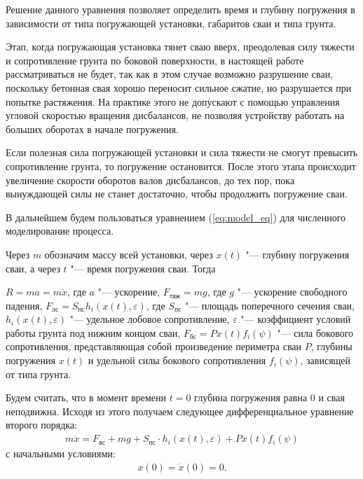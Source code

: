 Решение данного уравнения позволяет определить время и глубину погружения в зависимости от типа погружающей установки, габаритов сваи и типа грунта.

Этап, когда погружающая установка тянет сваю вверх, преодолевая силу тяжести и сопротивление грунта по боковой поверхности, в настоящей работе
рассматриваться не будет, так как в этом случае возможно разрушение сваи, поскольку бетонная свая хорошо переносит сильное сжатие, но разрушается
при попытке растяжения. На практике этого не допускают с помощью управления угловой скоростью вращения дисбалансов, не позволяя устройству
работать на больших оборотах в начале погружения.

Если полезная сила погружающей установки и сила тяжести не смогут превысить сопротивление грунта, то погружение остановится. После этого
этапа происходит увеличение скорости оборотов валов дисбалансов, до тех пор, пока вынуждающей силы не станет достаточно, чтобы продолжить
погружение сваи.

В дальнейшем будем пользоваться уравнением (\ref{eq:model_eq}) для численного моделирование процесса.

Через $m$ обозначим массу всей установки, через $x(t)$ "--- глубину погружения сваи, а через $t$ "--- время погружения сваи. Тогда

$R=ma=m\ddot{x}$, где $a$ "--- ускорение,
$F_{\textrm{тяж}}=mg$, где $g$ "--- ускорение свободного падения,
$F_{\textrm{лс}}=S_{\textrm{пс}}h_i(x(t),\varepsilon)$, где $S_{\textrm{пс}}$ "--- площадь поперечного сечения сваи, $h_i(x(t),\varepsilon)$ "--- удельное лобовое сопротивление,
$\varepsilon$ "--- коэффициент условий работы грунта под нижним концом сваи,
$F_{\textrm{бс}}=Px(t)f_i(\psi)$ "--- сила бокового сопротивления, представляющая собой произведение периметра сваи $P$, глубины погружения $x(t)$
и удельной силы бокового сопротивления $f_i(\psi)$, зависящей от типа грунта.

Будем считать, что в момент времени $t=0$ глубина погружения равна $0$ и свая неподвижна. Исходя из этого получаем следующее дифференциальное уравнение второго порядка:
\begin{equation}\label{eq:diff_2}
    \begin{gathered}
        m\ddot{x} = F_{\textrm{вс}} + mg + S_{\textrm{пс}} \cdot h_i(x(t),\varepsilon) + Px(t)f_i(\psi)
    \end{gathered}
\end{equation}
с начальными условиями:
\begin{equation}\label{eq:diff_start}
    \begin{gathered}
        x(0) = \dot{x}(0) = 0.
    \end{gathered}
\end{equation}

